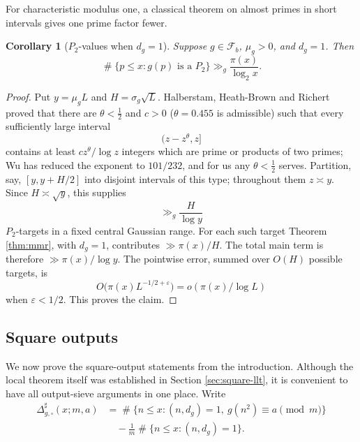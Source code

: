\documentclass[11pt,reqno]{amsart}
\theoremstyle{plain}
\newtheorem{corollary}[theorem]{Corollary}
\theoremstyle{definition}
\newcommand{\eps}{\varepsilon}
\newcommand{\1}{\mathbf 1}
\DeclareMathOperator{\Card}{\#}
\begin{document}
For characteristic modulus one, a classical theorem on almost primes in short intervals gives one prime factor fewer.

\begin{corollary}[$P_2$-values when $d_g=1$]\label{cor:p2}
Suppose $g\in\mathcal F_b$, $\mu_g>0$, and $d_g=1$.  Then
\[
 \Card\{p\le x:g(p)\text{ is a }P_2\}
 \gg_g\frac{\pi(x)}{\log_2x}.
\]
\end{corollary}

\begin{proof}
Put $y=\mu_gL$ and $H=\sigma_g\sqrt L$.  Halberstam, Heath-Brown and Richert \cite{hhbr} proved that there are $\theta<\tfrac12$ and $c>0$ ($\theta=0.455$ is admissible) such that every sufficiently large interval
\[
 (z-z^{\theta},z]
\]
contains at least $cz^\theta/\log z$ integers which are prime or products of two primes; Wu \cite{wu} has reduced the exponent to $101/232$, and for us any $\theta<\tfrac12$ serves.  Partition, say, $[y,y+H/2]$ into disjoint intervals of this type; throughout them $z\asymp y$.  Since $H\asymp\sqrt y$, this supplies
\[
 \gg_g\frac{H}{\log y}
\]
$P_2$-targets in a fixed central Gaussian range.  For each such target Theorem \ref{thm:mmr}, with $d_g=1$, contributes $\gg\pi(x)/H$.  The total main term is therefore $\gg\pi(x)/\log y$.  The pointwise error, summed over $O(H)$ possible targets, is
\[
 O\big(\pi(x)L^{-1/2+\eps}\big)=o(\pi(x)/\log L)
\]
when $\eps<1/2$.  This proves the claim.
\end{proof}

\subsection{Square outputs}

We now prove the square-output statements from the introduction.  Although the local theorem itself was established in Section \ref{sec:square-llt}, it is convenient to have all output-sieve arguments in one place.  Write
\begin{align*}
 \Delta_{g,\square}^{\sharp}(x;m,a)
 &=\Card\{n\le x:(n,d_g)=1,\ g(n^2)\equiv a\pmod m\}\\
 &\quad-\frac1m\Card\{n\le x:(n,d_g)=1\}.
\end{align*}
\end{document}
